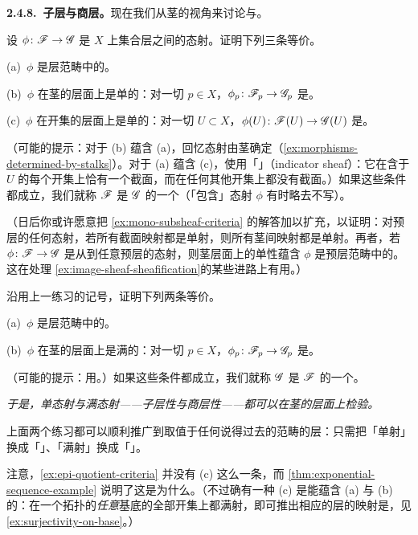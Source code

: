 \textbf{2.4.8.\ 子层与商层。}\quad 现在我们从茎的视角来讨论\trSubsheaf{}与\trQuotientSheaf。

\begin{exercise}\label{ex:mono-subsheaf-criteria}
设 $\phi\colon\mathscr{F}\to\mathscr{G}$ 是\trTopologicalSpace{} $X$ 上集合层之间的态射。证明下列三条等价。

(a)~$\phi$ 是层范畴中的\trMonomorphism。

(b)~$\phi$ 在茎的层面上是单的：对一切 $p\in X$，$\phi_p\colon\mathscr{F}_p\to\mathscr{G}_p$ 是\trInjectiveMap。

(c)~$\phi$ 在开集的层面上是单的：对一切\trOpenSubset{} $U\subset X$，$\phi(U)\colon\mathscr{F}(U)\to\mathscr{G}(U)$ 是\trInjectiveMap。

（可能的提示：对于 (b) 蕴含 (a)，回忆态射由茎确定（\cref{ex:morphisms-determined-by-stalks}）。对于 (a) 蕴含 (c)，使用「\trIndicatorSheaf」（indicator sheaf）：它在含于 $U$ 的每个开集上恰有一个截面，而在任何其他开集上都没有截面。）如果这些条件都成立，我们就称 $\mathscr{F}$ 是 $\mathscr{G}$ 的一个\trSubsheaf（「包含」态射 $\phi$ 有时略去不写）。
\end{exercise}

（日后你或许愿意把 \cref{ex:mono-subsheaf-criteria} 的解答加以扩充，以证明：对预层的任何态射，若所有截面映射都是单射，则所有茎间映射都是单射。再者，若 $\phi\colon\mathscr{F}\to\mathscr{G}$ 是从\trSeparated\trPresheaf{}到任意预层的态射，则茎层面上的单性蕴含 $\phi$ 是预层范畴中的\trMonomorphism。这在处理 \cref{ex:image-sheaf-sheafification}的某些进路上有用。）

\begin{exercise}\label{ex:epi-quotient-criteria}
沿用上一练习的记号，证明下列两条等价。

(a)~$\phi$ 是层范畴中的\trEpimorphism。

(b)~$\phi$ 在茎的层面上是满的：对一切 $p\in X$，$\phi_p\colon\mathscr{F}_p\to\mathscr{G}_p$ 是\trSurjectiveMap。

（可能的提示：用\trSkyscraperSheaf。）如果这些条件都成立，我们就称 $\mathscr{G}$ 是 $\mathscr{F}$ 的一个\trQuotientSheaf。
\end{exercise}

\emph{于是，单态射与满态射——子层性与商层性——都可以在茎的层面上检验。}

上面两个练习都可以顺利推广到取值于任何说得过去的范畴的层：只需把「单射」换成「\trMonomorphism」、「满射」换成「\trEpimorphism」。

注意，\cref{ex:epi-quotient-criteria} 并没有 (c) 这么一条，而 \cref{thm:exponential-sequence-example} 说明了这是为什么。（不过确有一种 (c) 是能蕴含 (a) 与 (b) 的：在一个拓扑的\emph{任意}基底的全部开集上都满射，即可推出相应的层的映射是\trEpimorphism，见 \cref{ex:surjectivity-on-base}。）

